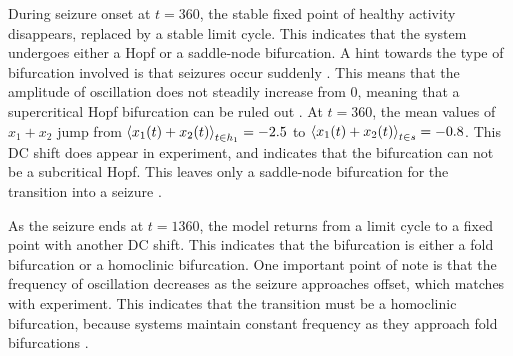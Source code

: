 During seizure onset at $t = 360$, the stable fixed point of healthy activity disappears, replaced by a stable limit cycle.
This indicates that the system undergoes either a Hopf or a saddle-node bifurcation.
A hint towards the type of bifurcation involved is that seizures occur suddenly \cite{Kandel2013}.
This means that the amplitude of oscillation does not steadily increase from 0, meaning that a supercritical Hopf bifurcation can be ruled out \cite{Strogatz2015}.
At $t = 360$, the mean values of $x_{1} + x_{2}$ jump from $\expval{x_{1}(t) + x_{2}(t)}_{t \in h_{1}} = -2.5$ to $\expval{x_{1}(t) + x_{2}(t)}_{t \in s} = -0.8$.
This DC shift does appear in experiment, and indicates that the bifurcation can not be a subcritical Hopf.
This leaves only a saddle-node bifurcation for the transition into a seizure \cite{Jirsa2014}.

As the seizure ends at $t = 1360$, the model returns from a limit cycle to a fixed point with another DC shift.
This indicates that the bifurcation is either a fold bifurcation or a homoclinic bifurcation.
One important point of note is that the frequency of oscillation decreases as the seizure approaches offset, which matches with experiment.
This indicates that the transition must be a homoclinic bifurcation, because systems maintain constant frequency as they approach fold bifurcations \cite{Jirsa2014}.

